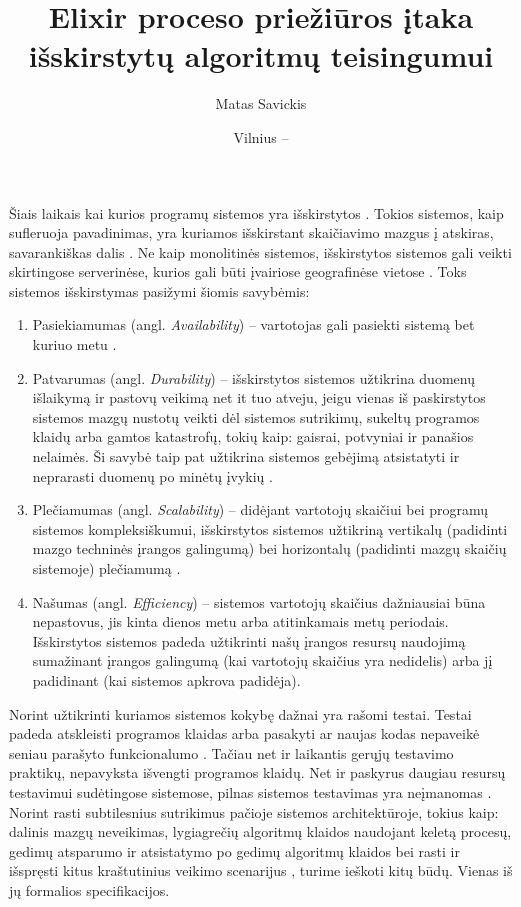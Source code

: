 \documentclass{VUMIFPSmagistrinis}
\title{Elixir proceso priežiūros įtaka išskirstytų algoritmų teisingumui}
\author{Matas Savickis}
\date{Vilnius – \the\year}
\begin{document}

\maketitle

\tableofcontents



		Šiais laikais kai kurios programų sistemos yra išskirstytos \cite{mcr}. 
		Tokios sistemos, kaip sufleruoja pavadinimas, yra kuriamos išskirstant skaičiavimo mazgus į atskiras, savarankiškas dalis \cite{coulouris2005distributed}.
		Ne kaip monolitinės sistemos, išskirstytos sistemos gali veikti skirtingose serverinėse, kurios gali būti įvairiose geografinėse vietose \cite{shirriff2006method}.
		Toks sistemos išskirstymas pasižymi šiomis savybėmis:

		\begin{enumerate}
			\item{Pasiekiamumas (angl. {\it Availability}) -- vartotojas gali pasiekti sistemą bet kuriuo metu \cite{180327}.}
			\item{Patvarumas (angl. {\it Durability}) -- išskirstytos sistemos užtikrina duomenų išlaikymą ir pastovų veikimą net it tuo atveju, jeigu vienas iš paskirstytos sistemos mazgų nustotų veikti dėl sistemos sutrikimų, sukeltų programos klaidų arba gamtos katastrofų, tokių kaip: gaisrai, potvyniai ir panašios nelaimės. Ši savybė taip pat užtikrina sistemos gebėjimą atsistatyti ir neprarasti duomenų po minėtų įvykių \cite{5470366}.}
			\item{Plečiamumas (angl. {\it Scalability}) -- didėjant vartotojų skaičiui bei programų sistemos kompleksiškumui, išskirstytos sistemos užtikriną vertikalų (padidinti mazgo techninės įrangos galingumą) bei horizontalų (padidinti mazgų skaičių sistemoje) plečiamumą \cite{862209}.}
			\item{Našumas (angl. {\it Efficiency}) -- sistemos vartotojų skaičius dažniausiai būna nepastovus, jis kinta dienos metu arba atitinkamais metų periodais. Išskirstytos sistemos padeda užtikrinti našų įrangos resursų naudojimą sumažinant įrangos galingumą (kai vartotojų skaičius yra nedidelis) arba jį padidinant (kai sistemos apkrova padidėja).}
		\end{enumerate}

		Norint užtikrinti kuriamos sistemos kokybę dažnai yra rašomi testai. 
		Testai padeda atskleisti programos klaidas arba pasakyti ar naujas kodas nepaveikė seniau parašyto funkcionalumo \cite{819971}.
		Tačiau net ir laikantis gerųjų testavimo praktikų, nepavyksta išvengti programos klaidų.
		Net ir paskyrus daugiau resursų testavimui sudėtingose sistemose, pilnas sistemos testavimas yra neįmanomas \cite{sullivan2004software}.
		Norint rasti subtilesnius sutrikimus pačioje sistemos architektūroje, tokius kaip: dalinis mazgų neveikimas, lygiagrečių algoritmų klaidos naudojant keletą procesų, gedimų atsparumo ir atsistatymo po gedimų algoritmų klaidos bei rasti ir išspręsti kitus kraštutinius veikimo scenarijus \cite{newcombe2014use}, turime ieškoti kitų būdų. 
		Vienas iš jų formalios specifikacijos.
\end{document}
